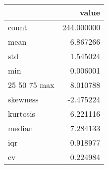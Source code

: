 \begin{tabular}{lr}
\toprule
 & value \\
\midrule
count & 244.000000 \\
mean & 6.867266 \\
std & 1.545024 \\
min & 0.006001 \\
25%
50%
75%
max & 8.010788 \\
skewness & -2.475224 \\
kurtosis & 6.221116 \\
median & 7.284133 \\
iqr & 0.918977 \\
cv & 0.224984 \\
\bottomrule
\end{tabular}
